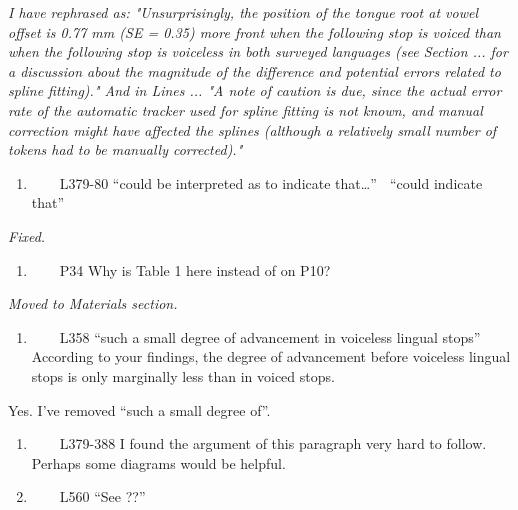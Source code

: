 \documentclass[]{article}
\providecommand{\tightlist}{%
  \setlength{\itemsep}{0pt}\setlength{\parskip}{0pt}}
\begin{document}
\begin{adjustwidth}{1cm}{} \textit{
I have rephrased as: "Unsurprisingly, the position of the tongue root at vowel offset is 0.77 mm (SE = 0.35) more front when the following stop is voiced than when the following stop is voiceless in both surveyed languages (see Section ... for a discussion about the magnitude of the difference and potential errors related to spline fitting)." And in Lines ... "A note of caution is due, since the actual error rate of the automatic tracker used for spline fitting is not known, and manual correction might have affected the splines (although a relatively small number of tokens had to be manually corrected)."
} \end{adjustwidth}

\begin{enumerate}
\def\labelenumi{\arabic{enumi}.}
\setcounter{enumi}{16}
\tightlist
\item
  ~~~~L379-80 ``could be interpreted as to indicate that\ldots{}'' 
  ``could indicate that''
\end{enumerate}

\begin{adjustwidth}{1cm}{} \textit{
Fixed.
} \end{adjustwidth}

\begin{enumerate}
\def\labelenumi{\arabic{enumi}.}
\setcounter{enumi}{17}
\tightlist
\item
  ~~~~P34 Why is Table 1 here instead of on P10?
\end{enumerate}

\begin{adjustwidth}{1cm}{} \textit{
Moved to Materials section.
} \end{adjustwidth}

\begin{enumerate}
\def\labelenumi{\arabic{enumi}.}
\setcounter{enumi}{18}
\tightlist
\item
  ~~~~L358 ``such a small degree of advancement in voiceless lingual
  stops'' According to your findings, the degree of advancement before
  voiceless lingual stops is only marginally less than in voiced stops.
\end{enumerate}

Yes. I've removed ``such a small degree of''.

\begin{enumerate}
\def\labelenumi{\arabic{enumi}.}
\setcounter{enumi}{19}
\item
  ~~~~L379-388 I found the argument of this paragraph very hard to
  follow. Perhaps some diagrams would be helpful.
\item
  ~~~~L560 ``See ??''
\end{enumerate}
\end{document}
